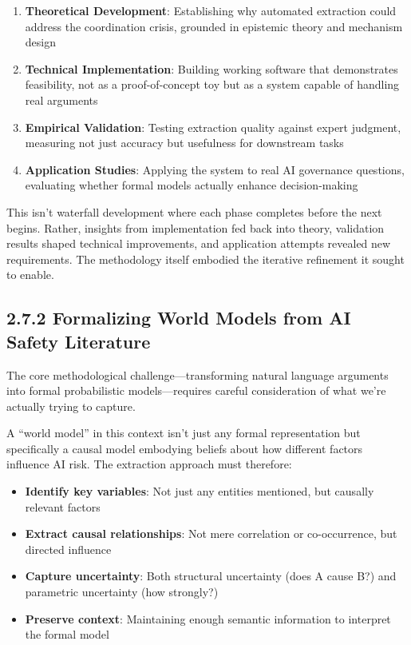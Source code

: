 \documentclass[
  11pt,
  letterpaper,
]{book}
\providecommand{\tightlist}{%
  \setlength{\itemsep}{0pt}\setlength{\parskip}{0pt}}
\begin{document}
\begin{enumerate}
\def\labelenumi{\arabic{enumi}.}
\tightlist
\item
  \textbf{Theoretical Development}: Establishing why automated
  extraction could address the coordination crisis, grounded in
  epistemic theory and mechanism design
\item
  \textbf{Technical Implementation}: Building working software that
  demonstrates feasibility, not as a proof-of-concept toy but as a
  system capable of handling real arguments
\item
  \textbf{Empirical Validation}: Testing extraction quality against
  expert judgment, measuring not just accuracy but usefulness for
  downstream tasks
\item
  \textbf{Application Studies}: Applying the system to real AI
  governance questions, evaluating whether formal models actually
  enhance decision-making
\end{enumerate}

This isn't waterfall development where each phase completes before the
next begins. Rather, insights from implementation fed back into theory,
validation results shaped technical improvements, and application
attempts revealed new requirements. The methodology itself embodied the
iterative refinement it sought to enable.

\subsection{2.7.2 Formalizing World Models from AI Safety
Literature}\label{sec-formalizing-world-models}

The core methodological challenge---transforming natural language
arguments into formal probabilistic models---requires careful
consideration of what we're actually trying to capture.

A ``world model'' in this context isn't just any formal representation
but specifically a causal model embodying beliefs about how different
factors influence AI risk. The extraction approach must therefore:

\begin{itemize}
\tightlist
\item
  \textbf{Identify key variables}: Not just any entities mentioned, but
  causally relevant factors
\item
  \textbf{Extract causal relationships}: Not mere correlation or
  co-occurrence, but directed influence
\item
  \textbf{Capture uncertainty}: Both structural uncertainty (does A
  cause B?) and parametric uncertainty (how strongly?)
\item
  \textbf{Preserve context}: Maintaining enough semantic information to
  interpret the formal model
\end{itemize}
\end{document}
